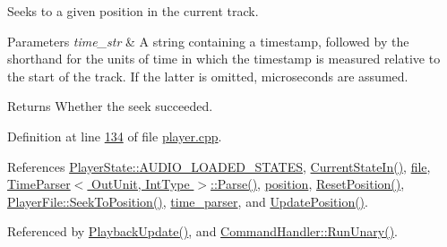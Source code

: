 Seeks to a given position in the current track. 


\begin{DoxyParams}{Parameters}
{\em time\+\_\+str} & A string containing a timestamp, followed by the shorthand for the units of time in which the timestamp is measured relative to the start of the track. If the latter is omitted, microseconds are assumed. \\
\hline
\end{DoxyParams}
\begin{DoxyReturn}{Returns}
Whether the seek succeeded. 
\end{DoxyReturn}


Definition at line \hyperlink{player_8cpp_source_l00134}{134} of file \hyperlink{player_8cpp_source}{player.\+cpp}.



References \hyperlink{player__state_8hpp_source_l00047}{Player\+State\+::\+A\+U\+D\+I\+O\+\_\+\+L\+O\+A\+D\+E\+D\+\_\+\+S\+T\+A\+T\+E\+S}, \hyperlink{player__state_8cpp_source_l00021}{Current\+State\+In()}, \hyperlink{player_8hpp_source_l00044}{file}, \hyperlink{time__parser_8hpp_source_l00065}{Time\+Parser$<$ Out\+Unit, Int\+Type $>$\+::\+Parse()}, \hyperlink{player_8hpp_source_l00045}{position}, \hyperlink{player__position_8cpp_source_l00032}{Reset\+Position()}, \hyperlink{player__file_8hpp_source_l00081}{Player\+File\+::\+Seek\+To\+Position()}, \hyperlink{player_8hpp_source_l00049}{time\+\_\+parser}, and \hyperlink{player__position_8cpp_source_l00026}{Update\+Position()}.



Referenced by \hyperlink{player_8cpp_source_l00045}{Playback\+Update()}, and \hyperlink{cmd_8cpp_source_l00041}{Command\+Handler\+::\+Run\+Unary()}.


